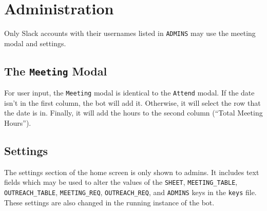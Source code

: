 \documentclass[english]{article}
\begin{document}
\section{Administration}

Only Slack accounts with their usernames listed in \texttt{ADMINS}
may use the meeting modal and settings.

\subsection{The \texttt{Meeting} Modal}

For user input, the \texttt{Meeting} modal is identical to the \texttt{Attend}
modal. If the date isn't in the first column, the bot will add it.
Otherwise, it will select the row that the date is in. Finally, it
will add the hours to the second column (``Total Meeting Hours'').

\subsection{Settings}

The settings section of the home screen is only shown to admins. It
includes text fields which may be used to alter the values of the
\texttt{SHEET}, \texttt{MEETING\_TABLE}, \texttt{OUTREACH\_TABLE},
\texttt{MEETING\_REQ}, \texttt{OUTREACH\_REQ}, and \texttt{ADMINS}
keys in the \texttt{keys} file. These settings are also changed in
the running instance of the bot.
\end{document}

